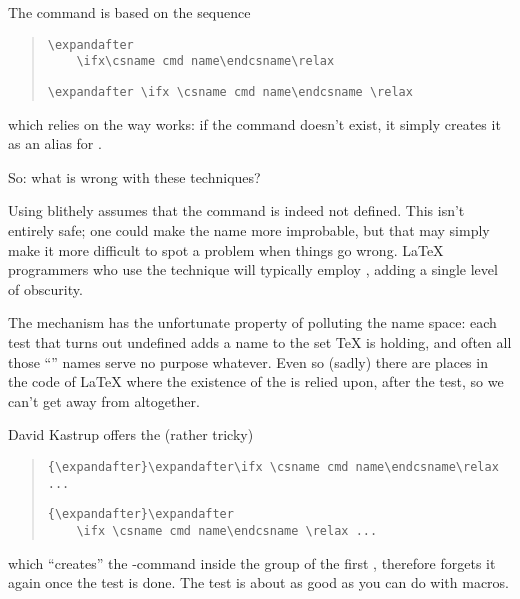 The  command is based on the sequence
\begin{quote}
\begin{narrowversion}
\begin{verbatim}
\expandafter
    \ifx\csname cmd name\endcsname\relax
\end{verbatim}
\end{narrowversion}
\begin{wideversion}
\begin{verbatim}
\expandafter \ifx \csname cmd name\endcsname \relax
\end{verbatim}
\end{wideversion}
\end{quote}
which relies on the way  works: if the command doesn't
exist, it simply creates it as an alias for .

So: what is wrong with these techniques?

Using  blithely assumes that the command is indeed not
defined.  This isn't entirely safe; one could make the name more
improbable, but that may simply make it more difficult to spot a
problem when things go wrong.  \LaTeX{} programmers who use the
technique will typically employ , adding a single
level of obscurity.

The  mechanism has the unfortunate property of
polluting the name space: each test that turns out undefined adds a
name to the set \TeX{} is holding, and often all those ``''
names serve no purpose whatever.  Even so (sadly) there are places in
the code of \LaTeX{} where the existence of the  is relied
upon, after the test, so we can't get away from 
altogether.

David Kastrup offers the (rather tricky)
\begin{quote}
\begin{wideversion}
\begin{verbatim}
{\expandafter}\expandafter\ifx \csname cmd name\endcsname\relax ...
\end{verbatim}
\end{wideversion}
\begin{narrowversion}
\begin{verbatim}
{\expandafter}\expandafter
    \ifx \csname cmd name\endcsname \relax ...
\end{verbatim}
\end{narrowversion}
\end{quote}
which ``creates'' the -command inside the group of the first
, therefore forgets it again once the test is done.
The test is about as good as you can do with macros.

